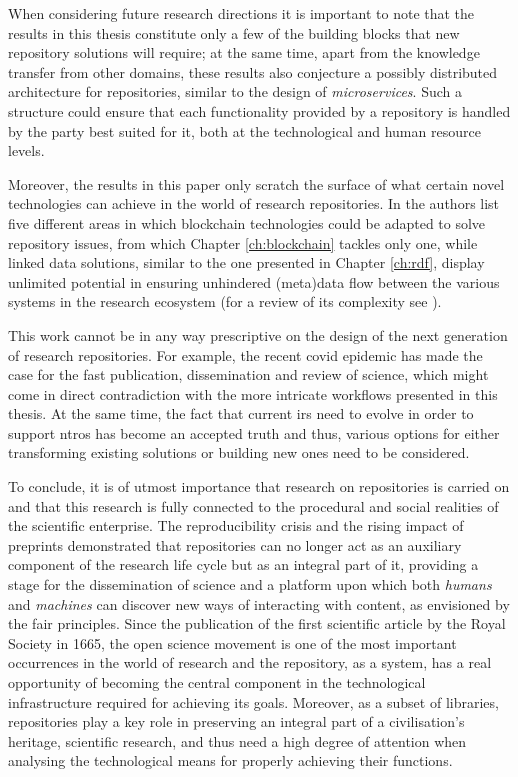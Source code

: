 When considering future research directions it is important to note that the results in this thesis constitute only a few of the building blocks that new repository solutions will require; at the same time, apart from the knowledge transfer from other domains, these results also conjecture a possibly distributed architecture for repositories, similar to the design of \emph{microservices}. Such a structure could ensure that each functionality provided by a repository is handled by the party best suited for it, both at the technological and human resource levels.

Moreover, the results in this paper only scratch the surface of what certain novel technologies can achieve in the world of research repositories. In \cite{dsbc} the authors list five different areas in which blockchain technologies could be adapted to solve repository issues, from which Chapter \ref{ch:blockchain} tackles only one, while linked data solutions, similar to the one presented in Chapter \ref{ch:rdf}, display unlimited potential in ensuring unhindered (meta)data flow between the various systems in the research ecosystem (for a review of its complexity see \cite{101}).

This work cannot be in any way prescriptive on the design of the next generation of research repositories. For example, the recent \gls{covid} epidemic has made the case for the fast publication, dissemination and review of science\cite{cochran}, which might come in direct contradiction with the more intricate workflows presented in this thesis. At the same time, the fact that current \glspl{ir} need to evolve in order to support \glspl{ntro} has become an accepted truth and thus, various options for either transforming existing solutions or building new ones need to be considered.

To conclude, it is of utmost importance that research on repositories is carried on and that this research is fully connected to the procedural and social realities of the scientific enterprise. The reproducibility crisis and the rising impact of preprints demonstrated that repositories can no longer act as an auxiliary component of the research life cycle but as an integral part of it, providing a stage for the dissemination of science and a platform upon which both \emph{humans} and \emph{machines} can discover new ways of interacting with content, as envisioned by the \gls{fair} principles. Since the publication of the first scientific article by the Royal Society in 1665, the open science movement is one of the most important occurrences in the world of research and the repository, as a system, has a real opportunity of becoming the central component in the technological infrastructure required for achieving its goals. Moreover, as a subset of libraries, repositories play a key role in preserving an integral part of a civilisation's heritage, scientific research, and thus need a high degree of attention when analysing the technological means for properly achieving their functions.